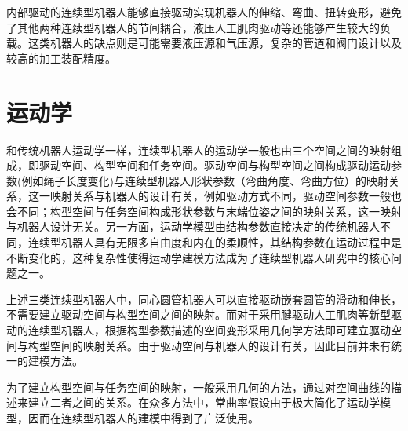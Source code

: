 内部驱动的连续型机器人能够直接驱动实现机器人的伸缩、弯曲、扭转变形，避免了其他两种连续型机器人的节间耦合，液压人工肌肉驱动等还能够产生较大的负载。这类机器人的缺点则是可能需要液压源和气压源，复杂的管道和阀门设计以及较高的加工装配精度。

\section{运动学}
和传统机器人运动学一样，连续型机器人的运动学一般也由三个空间之间的映射组成，即驱动空间、构型空间和任务空间。驱动空间与构型空间之间构成驱动运动参数(例如绳子长度变化)与连续型机器人形状参数（弯曲角度、弯曲方位）的映射关系，这一映射关系与机器人的设计有关，例如驱动方式不同，驱动空间参数一般也会不同；构型空间与任务空间构成形状参数与末端位姿之间的映射关系，这一映射与机器人设计无关\cite{webster_design_2010}。另一方面，运动学模型由结构参数直接决定的传统机器人不同，连续型机器人具有无限多自由度和内在的柔顺性，其结构参数在运动过程中是不断变化的，这种复杂性使得运动学建模方法成为了连续型机器人研究中的核心问题之一。
 
上述三类连续型机器人中，同心圆管机器人可以直接驱动嵌套圆管的滑动和伸长，不需要建立驱动空间与构型空间之间的映射。而对于采用腱驱动人工肌肉等新型驱动的连续型机器人，根据构型参数描述的空间变形采用几何学方法即可建立驱动空间与构型空间的映射关系\cite{jones_kinematics_2006,jones_practical_2006,webster_design_2010}。由于驱动空间与机器人的设计有关，因此目前并未有统一的建模方法。
 
为了建立构型空间与任务空间的映射，一般采用几何的方法，通过对空间曲线的描述来建立二者之间的关系。在众多方法中，常曲率假设由于极大简化了运动学模型，因而在连续型机器人的建模中得到了广泛使用。
 
